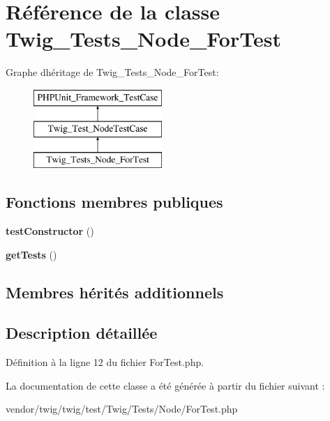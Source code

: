 \hypertarget{class_twig___tests___node___for_test}{}\section{Référence de la classe Twig\+\_\+\+Tests\+\_\+\+Node\+\_\+\+For\+Test}
\label{class_twig___tests___node___for_test}
Graphe d\textquotesingle{}héritage de Twig\+\_\+\+Tests\+\_\+\+Node\+\_\+\+For\+Test\+:\begin{figure}[H]
\begin{center}
\leavevmode
\includegraphics[height=3.000000cm]{class_twig___tests___node___for_test}
\end{center}
\end{figure}
\subsection*{Fonctions membres publiques}
\begin{DoxyCompactItemize}
\item 
{\bfseries test\+Constructor} ()\hypertarget{class_twig___tests___node___for_test_a47094dc941e72950570900d1418f89c6}{}\label{class_twig___tests___node___for_test_a47094dc941e72950570900d1418f89c6}

\item 
{\bfseries get\+Tests} ()\hypertarget{class_twig___tests___node___for_test_a7e247dd31cc8d37a6c97353a062a0080}{}\label{class_twig___tests___node___for_test_a7e247dd31cc8d37a6c97353a062a0080}

\end{DoxyCompactItemize}
\subsection*{Membres hérités additionnels}


\subsection{Description détaillée}


Définition à la ligne 12 du fichier For\+Test.\+php.



La documentation de cette classe a été générée à partir du fichier suivant \+:\begin{DoxyCompactItemize}
\item 
vendor/twig/twig/test/\+Twig/\+Tests/\+Node/For\+Test.\+php\end{DoxyCompactItemize}
